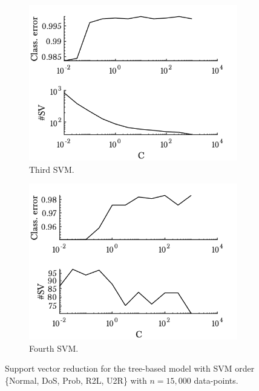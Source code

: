 \begin{figure}[h!]
\begin{subfigure}[b]{.47\textwidth}
            \centering 
            \includegraphics[width=.98\textwidth]{parts/chap-4/img-svm/non-lin/svm3.png}
            \caption{Third SVM.} 
        \end{subfigure}
        \hfill
        \begin{subfigure}[b]{.47\textwidth}   
            \centering 
            \includegraphics[width=.98\textwidth]{parts/chap-4/img-svm/non-lin/svm4.png}
            \caption{Fourth SVM.} 
        \end{subfigure}
        \caption[Support vector reduction.]{Support vector reduction for the tree-based model with SVM order \{Normal, DoS, Prob, R2L, U2R\} with $n=15,000$ data-points.}
        \label{fig:svm-nl-red}
\end{figure}

